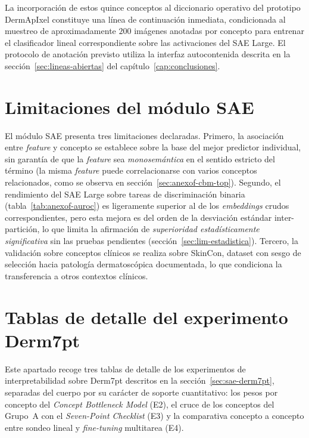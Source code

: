 La incorporación de estos quince conceptos al diccionario operativo
del prototipo DermApIxel constituye una línea de continuación
inmediata, condicionada al muestreo de aproximadamente
$200$ imágenes anotadas por concepto para entrenar el
clasificador lineal correspondiente sobre las activaciones del SAE
Large. El protocolo de anotación previsto utiliza la interfaz
autocontenida descrita en la sección~\ref{sec:lineas-abiertas} del
capítulo~\ref{cap:conclusiones}.

\section{Limitaciones del módulo SAE}
\label{sec:anexof-limitaciones}

El módulo SAE presenta tres limitaciones declaradas. Primero, la
asociación entre \emph{feature} y concepto se establece sobre la
base del mejor predictor individual, sin garantía de que la
\emph{feature} sea \emph{monosemántica} en el sentido estricto del
término (la misma \emph{feature} puede correlacionarse con varios
conceptos relacionados, como se observa en
sección~\ref{sec:anexof-cbm-top}). Segundo, el rendimiento del SAE Large
sobre tareas de discriminación binaria
(tabla~\ref{tab:anexof-auroc}) es ligeramente superior al de los
\emph{embeddings} crudos correspondientes, pero esta mejora es del
orden de la desviación estándar inter-partición, lo que limita la
afirmación de \emph{superioridad estadísticamente significativa}
sin las pruebas pendientes (sección~\ref{sec:lim-estadistica}).
Tercero, la validación sobre conceptos clínicos se realiza sobre
SkinCon, dataset con sesgo de selección hacia patología
dermatoscópica documentada, lo que condiciona la transferencia a
otros contextos clínicos.

\section{Tablas de detalle del experimento Derm7pt}
\label{sec:anexof-d7pt-detalle}

Este apartado recoge tres tablas de detalle de los experimentos de
interpretabilidad sobre Derm7pt descritos en la
sección~\ref{sec:sae-derm7pt}, separadas del cuerpo por su carácter
de soporte cuantitativo: los pesos por concepto del \emph{Concept
Bottleneck Model} (E2), el cruce de los conceptos del Grupo~A con el
\emph{Seven-Point Checklist} (E3) y la comparativa concepto a
concepto entre sondeo lineal y \emph{fine-tuning} multitarea (E4).

